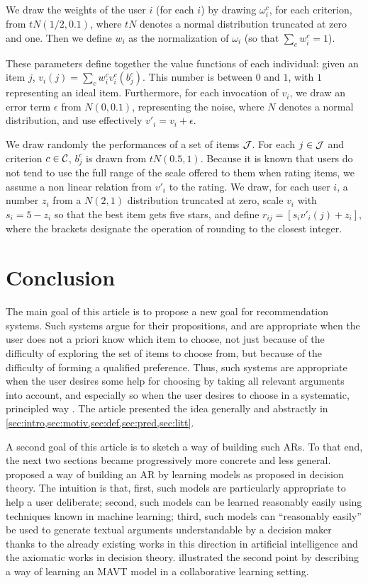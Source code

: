 \documentclass[version=3.21, pagesize, twoside=off, bibliography=totoc, DIV=calc, fontsize=12pt, a4paper, french, english]{scrartcl}
\begin{document}
We draw the weights of the user $i$ (for each $i$) by drawing $\omega^c_i$, for each criterion, from $tN(1/2, 0.1)$, where $tN$ denotes a normal distribution truncated at zero and one. Then we define $w_i$ as the normalization of $\omega_i$ (so that $\sum_c w_i^c = 1$).

These parameters define together the value functions of each individual: given an item $j$, $v_i(j) = \sum_c w^c_i v_i^c(b^c_j)$. This number is between $0$ and $1$, with $1$ representing an ideal item. Furthermore, for each invocation of $v_i$, we draw an error term $\epsilon$ from $N(0, 0.1)$, representing the noise, where $N$ denotes a normal distribution, and use effectively $v'_i = v_i + \epsilon$.

We draw randomly the performances of a set of items $\mathcal{J}$. For each $j \in \mathcal{J}$ and criterion $c \in \mathcal{C}$, $b_j^c$ is drawn from $tN(0.5, 1)$. Because it is known that users do not tend to use the full range of the scale offered to them when rating items, we assume a non linear relation from $v'_i$ to the rating. We draw, for each user $i$, a number $z_i$ from a $N(2, 1)$ distribution truncated at zero, scale $v_i$ with $s_i = 5 - z_i$ so that the best item gets five stars, and define $r_{ij} = [s_i v'_i(j) + z_i]$, where the brackets designate the operation of rounding to the closest integer. 

\section{Conclusion}
The main goal of this article is to propose a new goal for recommendation systems. Such systems argue for their propositions, and are appropriate when the user does not a priori know which item to choose, not just because of the difficulty of exploring the set of items to choose from, but because of the difficulty of forming a qualified preference. Thus, such systems are appropriate when the user desires some help for choosing by taking all relevant arguments into account, and especially so when the user desires to choose in a systematic, principled way .
The article presented the idea generally and abstractly in \cref{sec:intro,sec:motiv,sec:def,sec:pred,sec:litt}. 

A second goal of this article is to sketch a way of building such \acp{AR}. To that end, the next two sections became progressively more concrete and less general.  proposed a way of building an \ac{AR} by learning models as proposed in decision theory. The intuition is that, first, such models are particularly appropriate to help a user deliberate; second, such models can be learned reasonably easily using techniques known in machine learning; third, such models can “reasonably easily” be used to generate textual arguments understandable by a decision maker thanks to the already existing works in this direction in artificial intelligence and the axiomatic works in decision theory.  illustrated the second point by describing a way of learning an \ac{MAVT} model in a collaborative learning setting.
\end{document}
